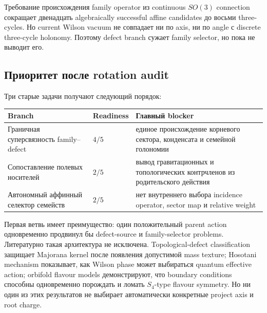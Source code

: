 \begin{proposition}
Требование происхождения family operator из continuous \(SO(3)\)
connection сокращает двенадцать algebraically successful affine candidates
до восьми three-cycles. Но current Wilson vacuum не совпадает ни по axis,
ни по angle с discrete three-cycle holonomy. Поэтому defect branch сужает
family selector, но пока не выводит его.
\end{proposition}

\subsection{Приоритет после rotation audit}

Три старые задачи получают следующий порядок:
\begin{center}
\small
\begin{tabular}{>{\raggedright\arraybackslash}p{}>{\raggedright\arraybackslash}p{}>{\raggedright\arraybackslash}p{}}
\toprule
Branch & Readiness & Главный blocker\\
\midrule
Граничная суперсвязность family--defect & \(4/5\) &
единое происхождение корневого сектора, конденсата и семейной голономии\\
Сопоставление полевых носителей & \(2/5\) &
вывод гравитационных и топологических контрчленов из родительского действия\\
Автономный аффинный селектор семейств & \(2/5\) &
нет внутреннего выбора incidence operator, sector map и relative weight\\
\bottomrule
\end{tabular}
\end{center}

Первая ветвь имеет преимущество: один положительный parent action
одновременно продвинул бы defect-source и family-selector problems.
Литературно такая архитектура не исключена. Topological-defect
classification защищает Majorana kernel после появления допустимой mass
texture; Hosotani mechanism показывает, как Wilson phase может выбираться
quantum effective action; orbifold flavour models демонстрируют, что
boundary conditions способны одновременно порождать и ломать \(S_4\)-type
flavour symmetry. Но ни один из этих результатов не выбирает автоматически
конкретные project axis и root charge.

